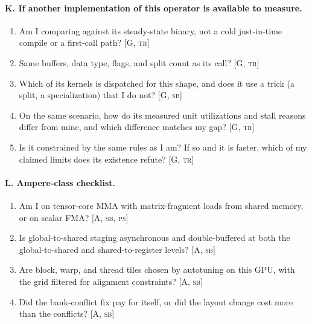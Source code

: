 \paragraph{K. If another implementation of this operator is available to measure.}
\begin{enumerate}[nosep,leftmargin=*,resume]
\item Am I comparing against its steady-state binary, not a cold just-in-time compile or a first-call path? [G, \textsc{tr}]
\item Same buffers, data type, flags, and split count as its call? [G, \textsc{tr}]
\item Which of its kernels is dispatched for this shape, and does it use a trick (a split, a specialization) that I do not? [G, \textsc{sb}]
\item On the same scenario, how do its measured unit utilizations and stall reasons differ from mine, and which difference matches my gap? [G, \textsc{tr}]
\item Is it constrained by the same rules as I am? If so and it is faster, which of my claimed limits does its existence refute? [G, \textsc{tr}]
\end{enumerate}

\paragraph{L. Ampere-class checklist.}
\begin{enumerate}[nosep,leftmargin=*,resume]
\item Am I on tensor-core MMA with matrix-fragment loads from shared memory, or on scalar FMA? [A, \textsc{sb}, \textsc{ps}]
\item Is global-to-shared staging asynchronous and double-buffered at both the global-to-shared and shared-to-register levels? [A, \textsc{sb}]
\item Are block, warp, and thread tiles chosen by autotuning on this GPU, with the grid filtered for alignment constraints? [A, \textsc{sb}]
\item Did the bank-conflict fix pay for itself, or did the layout change cost more than the conflicts? [A, \textsc{sb}]
\end{enumerate}

